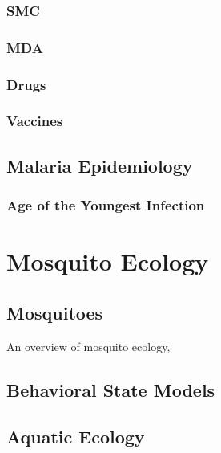 \documentclass[
]{book}
\begin{document}
\hypertarget{smc}{%
\section{SMC}\label{smc}}

\hypertarget{mda}{%
\section{MDA}\label{mda}}

\hypertarget{drugs}{%
\section{Drugs}\label{drugs}}

\hypertarget{vaccines}{%
\section{Vaccines}\label{vaccines}}

\hypertarget{malaria-epidemiology}{%
\chapter{Malaria Epidemiology}\label{malaria-epidemiology}}

\hypertarget{age-of-the-youngest-infection}{%
\section{Age of the Youngest Infection}\label{age-of-the-youngest-infection}}

\hypertarget{part-mosquito-ecology}{%
\part{Mosquito Ecology}\label{part-mosquito-ecology}}

\hypertarget{mosquitoes}{%
\chapter{Mosquitoes}\label{mosquitoes}}

An overview of mosquito ecology,

\hypertarget{behavioral-state-models}{%
\chapter{Behavioral State Models}\label{behavioral-state-models}}

\hypertarget{aquatic-ecology}{%
\chapter{Aquatic Ecology}\label{aquatic-ecology}}
\end{document}
